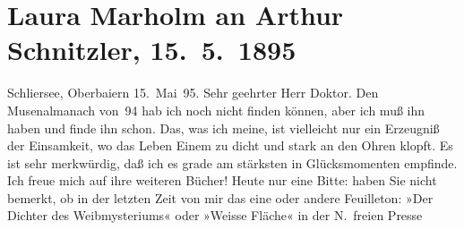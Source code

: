 

         
         \newcommand{\erwaehntePersonen}{Personen: Jules-Amédée Barbey d’Aurevilly}
         \newcommand{\erwaehnteInstitutionen}{}
         \newcommand{\erwaehnteOrte}{Orte: Oberbayern, Schliersee, Wien}
         \newcommand{\erwaehnteWerke}{Werke: Der Dichter des Weibmysteriums, Die Zukunft, Moderner Musen-Almanach auf das Jahr 1894. Ein Jahrbuch deutscher Kunst, Neue Freie Presse, Weiße Fläche, Wir Frauen und unsere Dichter}
               \section[Laura Marholm an Arthur Schnitzler, 15. 5. 1895]{ Laura Marholm an Arthur Schnitzler, 15. 5. 1895}\nopagebreak{}\rehead{ }\begin{ledgroupsized}[t]{13cm}\normalsize\beginnumbering \toendnotes[C]{\smallbreak\pagebreak[2]} 
\toendnotes[C]{\smallbreak}\pstart
           \noindent{}\raggedleft{}{\pb}Schliersee, Oberbaiern\pend
           \pstart
           \raggedleft{}15. Mai 95.\pend
           \pstart{}Sehr geehrter Herr Doktor.\pend\pstart
           Den Musenalmanach von 94 hab ich noch nicht
                    finden können, aber ich muß ihn haben und finde ihn schon. Das, was ich meine,
                    ist vielleicht nur ein Erzeugniß der Einsamkeit, wo das Leben Einem zu dicht und
                    stark an den Ohren klopft. Es ist sehr merkwürdig, daß ich es grade am stärksten
                    in Glücksmomenten empfinde.\pend
           \pstart
           Ich freue mich auf ihre weiteren Bücher!\pend
           \pstart
           Heute nur eine Bitte: haben Sie nicht bemerkt, ob in der letzten Zeit von mir das
                    eine oder andere Feuilleton: »Der Dichter des
                        Weibmysteriums« oder »Weisse
                            Fläche« in der N. freien Presse

\end{ledgroupsized}
